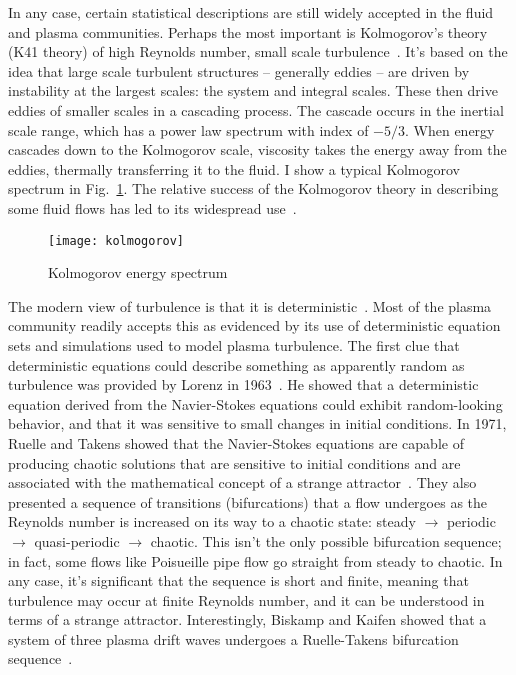 In any case, certain statistical descriptions are still widely accepted in the fluid and plasma communities. Perhaps the most important is Kolmogorov's theory (K41 theory) of high Reynolds number,
small scale turbulence~\cite{Kolmogorov1941,tennekes1972}. 
It's based on the idea that large scale turbulent structures -- generally eddies -- are driven by instability at the largest scales: the system and integral scales. 
These then drive eddies of smaller scales in a cascading process. The cascade occurs in the inertial scale range, which has a power law spectrum with index of $-5/3$. When energy
cascades down to the Kolmogorov scale, viscosity takes the energy away from the eddies, thermally transferring it to the fluid. I show a typical Kolmogorov spectrum in Fig.~\ref{kolmogorov}.
The relative success of the Kolmogorov theory in describing some fluid flows has led to its widespread use~\cite{manneville2004}.

\begin{figure}
\centerline{\texttt{[image: kolmogorov]}}
\caption{Kolmogorov energy spectrum}
\label{kolmogorov}
\end{figure}

The modern view of turbulence is that it is deterministic~\cite{swinney1981,mcdonough04}. 
Most of the plasma community readily accepts this as evidenced by its use of deterministic equation sets and simulations
used to model plasma turbulence. The first clue that deterministic equations could describe something as apparently random as turbulence was provided by Lorenz in 1963~\cite{lorenz1963}.
He showed that a deterministic equation derived from the Navier-Stokes equations could exhibit random-looking behavior, and that it was sensitive to small changes in initial conditions.
In 1971, Ruelle and Takens showed that the Navier-Stokes equations are capable of producing chaotic solutions that are sensitive to initial conditions and are associated with the mathematical
concept of a strange attractor~\cite{ruelle1971}. They also presented a sequence of transitions (bifurcations) that a flow undergoes as the Reynolds number is increased
on its way to a chaotic state: steady $\rightarrow$ periodic $\rightarrow$ quasi-periodic $\rightarrow$ chaotic. This isn't the only possible bifurcation sequence; 
in fact, some flows like Poisueille pipe flow go straight from steady to chaotic. 
In any case, it's significant that the sequence is short and finite, meaning that turbulence may occur at finite Reynolds number, and it can be understood in terms
of a strange attractor. Interestingly, Biskamp and Kaifen showed that a system of three plasma drift waves undergoes a Ruelle-Takens bifurcation sequence~\cite{biskamp1985}.

